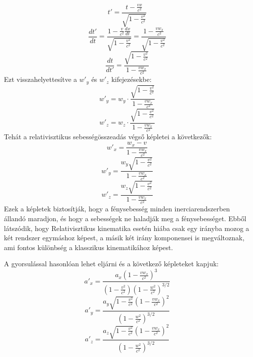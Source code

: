 \documentclass[a4paper,12pt]{article}
\begin{document}
\begin{equation}
    t' = \frac{t - \frac{vx}{c^2}}{\sqrt{1 - \frac{v^2}{c^2}}}
\end{equation}
\begin{equation}
    \frac{dt'}{dt} = \frac{1 - \frac{v}{c^2} \frac{dx}{dt}}{\sqrt{1 - \frac{v^2}{c^2}}} = \frac{1 - \frac{v w_x}{c^2}}{\sqrt{1 - \frac{v^2}{c^2}}}
\end{equation}
\begin{equation}
    \frac{dt}{dt'} = \frac{\sqrt{1 - \frac{v^2}{c^2}}}{1 - \frac{v w_x}{c^2}}
\end{equation}
Ezt visszahelyettesítve a $w'_y$ és $w'_z$ kifejezésekbe:
\begin{equation}
    w'_y = w_y \cdot \frac{\sqrt{1 - \frac{v^2}{c^2}}}{1 - \frac{v w_x}{c^2}}
\end{equation}
\begin{equation}
    w'_z = w_z \cdot \frac{\sqrt{1 - \frac{v^2}{c^2}}}{1 - \frac{v w_x}{c^2}}
\end{equation}
Tehát a relativisztikus sebességösszeadás végső képletei a következők:
\begin{equation}
    w'_x = \frac{w_x - v}{1 - \frac{v w_x}{c^2}}
\end{equation}
\begin{equation}
    w'_y = \frac{w_y \sqrt{1 - \frac{v^2}{c^2}}}{1 - \frac{v w_x}{c^2}}
\end{equation}
\begin{equation}
    w'_z = \frac{w_z \sqrt{1 - \frac{v^2}{c^2}}}{1 - \frac{v w_x}{c^2}}
\end{equation}
Ezek a képletek biztosítják, hogy a fénysebesség minden inerciarendszerben állandó maradjon, és hogy a sebességek ne haladják meg a fénysebességet. Ebből látszódik, hogy
Relativisztikus kinematika esetén hiába csak egy irányba mozog a két rendszer egymáshoz képest, a másik két irány komponensei is megváltoznak, ami fontos különbség a klasszikus kinematikához képest.

A gyorsulással hasonlóan lehet eljárni és a következő képleteket kapjuk:
\begin{equation}
    a'_x = \frac{a_x (1 - \frac{v w_x}{c^2})^3}{(1 - \frac{v^2}{c^2})(1 - \frac{w^2}{c^2})^{3/2}} 
\end{equation}
\begin{equation}
    a'_y = \frac{a_y \sqrt{1 - \frac{v^2}{c^2}} (1 - \frac{v w_x}{c^2})^2}{(1 - \frac{w^2}{c^2})^{3/2}}
\end{equation}
\begin{equation}
    a'_z = \frac{a_z \sqrt{1 - \frac{v^2}{c^2}} (1 - \frac{v w_x}{c^2})^2}{(1 - \frac{w^2}{c^2})^{3/2}}
\end{equation}
\end{document}

